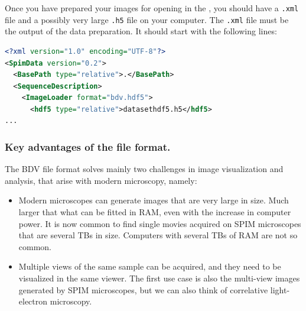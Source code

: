 Once you have prepared your images for opening in the \bdv, you should have a \texttt{.xml} file and a possibly very large \texttt{.h5} file on your computer. The \texttt{.xml} file must be the output of the \bdv data preparation. It should start with the following lines:

\begin{lstlisting}[language=XML]
<?xml version="1.0" encoding="UTF-8"?>
<SpimData version="0.2">
  <BasePath type="relative">.</BasePath>
  <SequenceDescription>
    <ImageLoader format="bdv.hdf5">
      <hdf5 type="relative">datasethdf5.h5</hdf5>
...
\end{lstlisting}


\subsubsection{Key advantages of the \Bdv file format.}
\label{sec:BDVAdvantages}

The BDV file format solves mainly two challenges in image visualization and analysis, that arise with modern microscopy, namely:
\begin{itemize}
    
    \item Modern microscopes can generate images that are very large in size. Much larger that what can be fitted in RAM, even with the increase in computer power. It is now common to find single movies acquired on SPIM microscopes that are several TBs in size. Computers with several TBs of RAM are not so common.
    
    \item Multiple views of the same sample can be acquired, and they need to be visualized in the same viewer. The first use case is also the multi-view images generated by SPIM microscopes, but we can also think of correlative light-electron microscopy.
    
\end{itemize}

